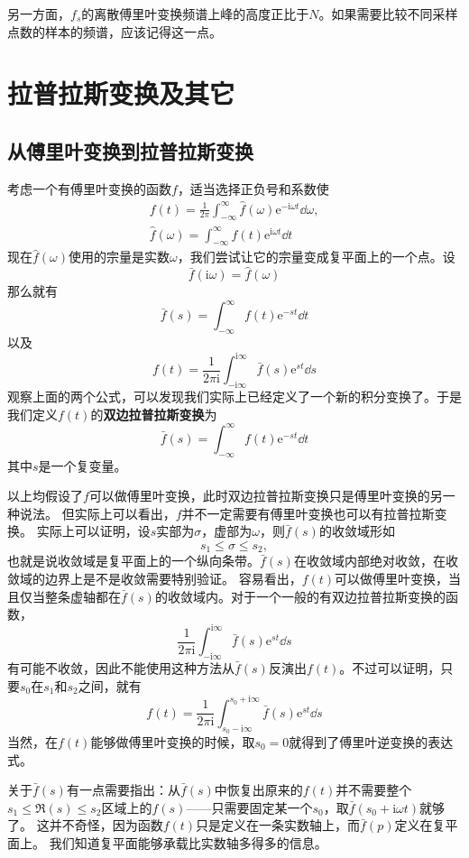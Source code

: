 \documentclass[UTF8]{ctexart}
\newcommand*{\ii}{\mathrm{i}}
\newcommand*{\ee}{\mathrm{e}}
\begin{document}
另一方面，$f_s$的离散傅里叶变换频谱上峰的高度正比于$N$。如果需要比较不同采样点数的样本的频谱，应该记得这一点。

\section{拉普拉斯变换及其它}

\subsection{从傅里叶变换到拉普拉斯变换}

考虑一个有傅里叶变换的函数$f$，适当选择正负号和系数使
\[
    \begin{split}
        f(t) = \frac{1}{2\pi} \int_{-\infty}^\infty \hat{f}(\omega) \ee^{-\ii \omega t} \dd \omega, \\
        \hat{f}(\omega) = \int_{-\infty}^\infty f(t) \ee^{\ii \omega t} \dd t
    \end{split}
\]
现在$\hat{f}(\omega)$使用的宗量是实数$\omega$，我们尝试让它的宗量变成复平面上的一个点。设
\[
    \bar{f}(\ii \omega) = \hat{f}(\omega)
\]
那么就有
\[
    \bar{f}(s) = \int_{-\infty}^\infty f(t) \ee^{-st} \dd t
\]
以及
\[
    f(t) = \frac{1}{2\pi \ii} \int_{-\ii \infty}^{\ii \infty} \bar{f}(s) \ee^{s t} \dd s
\]
观察上面的两个公式，可以发现我们实际上已经定义了一个新的积分变换了。于是我们定义$f(t)$的\textbf{双边拉普拉斯变换}为
\[
    \bar{f}(s) = \int_{-\infty}^\infty f(t) \ee^{-s t} \dd t
\]
其中$s$是一个复变量。

以上均假设了$f$可以做傅里叶变换，此时双边拉普拉斯变换只是傅里叶变换的另一种说法。
但实际上可以看出，$f$并不一定需要有傅里叶变换也可以有拉普拉斯变换。
实际上可以证明，设$s$实部为$\sigma$，虚部为$\omega$，则$\bar{f}(s)$的收敛域形如
\[
    s_1 \leq \sigma \leq s_2,
\]
也就是说收敛域是复平面上的一个纵向条带。$\bar{f}(s)$在收敛域内部绝对收敛，在收敛域的边界上是不是收敛需要特别验证。
容易看出，$f(t)$可以做傅里叶变换，当且仅当整条虚轴都在$\bar{f}(s)$的收敛域内。对于一个一般的有双边拉普拉斯变换的函数，
\[
    \frac{1}{2\pi \ii} \int_{-\ii \infty}^{\ii \infty} \bar{f}(s) \ee^{s t} \dd s
\]
有可能不收敛，因此不能使用这种方法从$\bar{f}(s)$反演出$f(t)$。不过可以证明，只要$s_0$在$s_1$和$s_2$之间，就有
\[
    f(t) = \frac{1}{2\pi \ii} \int_{s_0 -\ii \infty}^{s_0 + \ii \infty} \bar{f}(s) \ee^{s t} \dd s
\]
当然，在$f(t)$能够做傅里叶变换的时候，取$s_0=0$就得到了傅里叶逆变换的表达式。

关于$\bar{f}(s)$有一点需要指出：从$\bar{f}(s)$中恢复出原来的$f(t)$并不需要整个$s_1 \leq \Re(s) \leq s_2$区域上的$f(s)$——只需要固定某一个$s_0$，取$\bar{f}(s_0 + \ii \omega t)$就够了。
这并不奇怪，因为函数$f(t)$只是定义在一条实数轴上，而$\bar{f}(p)$定义在复平面上。
我们知道复平面能够承载比实数轴多得多的信息。
\end{document}
